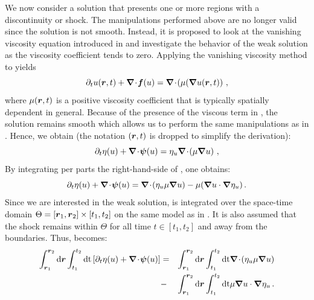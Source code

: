 We now consider a solution that presents one or more regions with a discontinuity or shock. The manipulations performed above are no longer valid since the solution is not smooth. Instead, it is proposed to look at the vanishing viscosity equation introduced in  and investigate the behavior of the weak solution as the viscosity coefficient tends to zero. Applying the vanishing viscosity method to  yields
%
\begin{equation}\label{eq:weak_sol7_sct1b}
\partial_t u( \boldsymbol r, t) + \boldsymbol{\nabla}\! \cdot \! \boldsymbol f(u) = \boldsymbol{\nabla}\! \cdot \! \left( \mu( \boldsymbol{\nabla} u( \boldsymbol r, t) \right) \,,
\end{equation}
%
where $\mu(\boldsymbol r,t )$ is a positive viscosity coefficient that is typically spatially dependent in general. Because of the presence of the viscous term in , the solution remains smooth which allows us to perform the same manipulations as in . Hence, we obtain (the notation $( \boldsymbol r, t)$ is dropped to simplify the derivation):
%
\begin{equation}\label{eq:weak_sol8_sct1b}
\partial_t \eta (u) + \boldsymbol{\nabla}\! \cdot \! \boldsymbol\psi (u) = \eta_u \boldsymbol{\nabla}\! \cdot \! \left( \mu \boldsymbol{\nabla} u \right) \,,
\end{equation}
%
By integrating per parts the right-hand-side of , one obtains: 
%
\begin{equation}\label{eq:weak_sol9_sct1b}
\partial_t \eta (u) + \boldsymbol{\nabla}\! \cdot \! \boldsymbol\psi (u) =  \boldsymbol{\nabla}\! \cdot \! \left( \eta_u \mu \boldsymbol{\nabla} u \right) - \mu( \boldsymbol{\nabla} u \cdot \boldsymbol{\nabla} \eta_u) \,.
\end{equation}
%
Since we are interested in the weak solution,  is integrated over the space-time domain $\Theta = \left[ \boldsymbol r_1,\boldsymbol r_2 \right] \times \left[ t_1,t_2 \right]$ on the same model as in . It is also assumed that the shock remains within $\Theta$ for all time $t \in \left[ t_1, t_2 \right]$ and away from the boundaries. Thus,  becomes:
%
\begin{eqnarray}\label{eq:weak_sol10_sct1b}
\int_{\boldsymbol r_1}^{\boldsymbol r_2}\text{d} \boldsymbol r \int_{t_1}^{t_2} \text{dt} \left[ \partial_t \eta (u) + \boldsymbol{\nabla}\! \cdot \! \boldsymbol\psi (u) \right] &=&
\int_{\boldsymbol r_1}^{\boldsymbol r_2}\text{d} \boldsymbol r \int_{t_1}^{t_2}\text{dt}  \boldsymbol{\nabla}\! \cdot \! \left( \eta_u \mu \boldsymbol{\nabla} u \right)    \nonumber \\
&-& \int_{\boldsymbol r_1}^{\boldsymbol r_2}\text{d} \boldsymbol r \int_{t_1}^{t_2} \text{dt} \mu \boldsymbol{\nabla} u \cdot \boldsymbol{\nabla} \eta_u \,.
\end{eqnarray}
